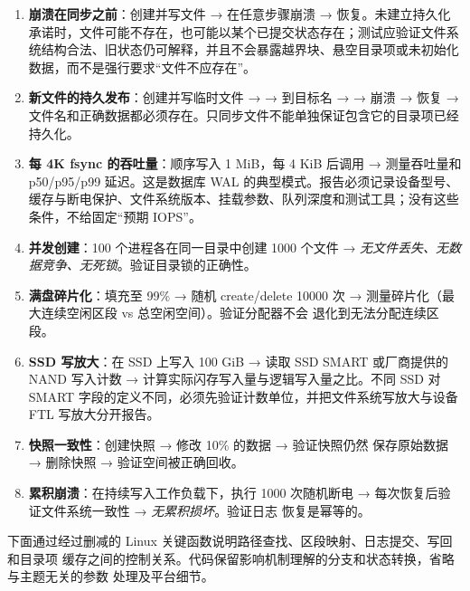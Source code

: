 \begin{filesystemlayout}
\begin{enumerate}\tightlist
\item \textbf{崩溃在同步之前}：创建并写文件 → 在任意步骤崩溃 → 恢复。未建立持久化承诺时，文件可能不存在，也可能以某个已提交状态存在；测试应验证文件系统结构合法、旧状态仍可解释，并且不会暴露越界块、悬空目录项或未初始化数据，而不是强行要求“文件不应存在”。
\item \textbf{新文件的持久发布}：创建并写临时文件 →  →  到目标名 →  → 崩溃 → 恢复 → 文件名和正确数据都必须存在。只同步文件不能单独保证包含它的目录项已经持久化。
\item \textbf{每 4K fsync 的吞吐量}：顺序写入 1 MiB，每 4 KiB 后调用
       → 测量吞吐量和 p50/p95/p99 延迟。这是数据库 WAL 的典型模式。报告必须记录设备型号、缓存与断电保护、文件系统版本、挂载参数、队列深度和测试工具；没有这些条件，不给固定“预期 IOPS”。
\item \textbf{并发创建}：100 个进程各在同一目录中创建 1000 个文件 →
      \emph{无文件丢失、无数据竞争、无死锁}。验证目录锁的正确性。
\item \textbf{满盘碎片化}：填充至 99\% → 随机 create/delete 10000 次 →
      测量碎片化（最大连续空闲区段 vs 总空闲空间）。验证分配器不会
      退化到无法分配连续区段。
\item \textbf{SSD 写放大}：在 SSD 上写入 100 GiB → 读取 SSD SMART
       或厂商提供的 NAND 写入计数 → 计算实际闪存写入量与逻辑写入量之比。不同 SSD 对 SMART 字段的定义不同，必须先验证计数单位，并把文件系统写放大与设备 FTL 写放大分开报告。
\item \textbf{快照一致性}：创建快照 → 修改 10\% 的数据 → 验证快照仍然
      保存原始数据 → 删除快照 → 验证空间被正确回收。
\item \textbf{累积崩溃}：在持续写入工作负载下，执行 1000 次随机断电 →
      每次恢复后验证文件系统一致性 → \emph{无累积损坏}。验证日志
      恢复是幂等的。
\end{enumerate}


下面通过经过删减的 Linux 关键函数说明路径查找、区段映射、日志提交、写回和目录项
缓存之间的控制关系。代码保留影响机制理解的分支和状态转换，省略与主题无关的参数
处理及平台细节。



\end{filesystemlayout}
